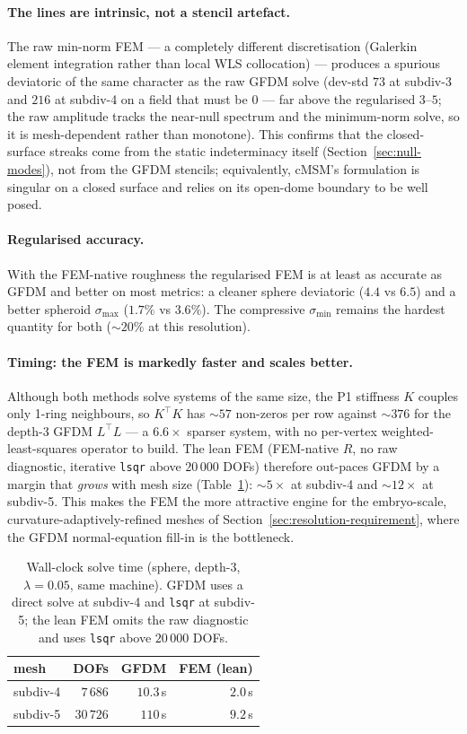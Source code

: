 \documentclass[11pt]{article}
\begin{document}
\paragraph{The lines are intrinsic, not a stencil artefact.}  The raw min-norm
FEM --- a completely different discretisation (Galerkin element integration rather
than local WLS collocation) --- produces a spurious deviatoric of the same
character as the raw GFDM solve (dev-std $73$ at subdiv-3 and $216$ at subdiv-4 on
a field that must be $0$ --- far above the regularised $3$--$5$; the raw amplitude
tracks the near-null spectrum and the minimum-norm solve, so it is mesh-dependent
rather than monotone).  This confirms that
the closed-surface streaks come from the static indeterminacy itself
(Section~\ref{sec:null-modes}), not from the GFDM stencils; equivalently, cMSM's
formulation is singular on a closed surface and relies on its open-dome boundary to
be well posed.

\paragraph{Regularised accuracy.}  With the FEM-native roughness the regularised
FEM is at least as accurate as GFDM and better on most metrics: a cleaner sphere
deviatoric ($4.4$ vs $6.5$) and a better spheroid $\sigma_{\max}$ ($1.7\%$ vs
$3.6\%$).  The compressive $\sigma_{\min}$ remains the hardest quantity for both
(${\sim}20\%$ at this resolution).

\paragraph{Timing: the FEM is markedly faster and scales better.}  Although both
methods solve systems of the same size, the P1 stiffness $K$ couples only 1-ring
neighbours, so $K^\top K$ has ${\sim}57$ non-zeros per row against ${\sim}376$ for
the depth-3 GFDM $L^\top L$ --- a $6.6\times$ sparser system, with no per-vertex
weighted-least-squares operator to build.  The lean FEM (FEM-native $R$, no raw
diagnostic, iterative \texttt{lsqr} above $20\,000$ DOFs) therefore out-paces GFDM
by a margin that \emph{grows} with mesh size (Table~\ref{tab:femtiming}):
${\sim}5\times$ at subdiv-4 and ${\sim}12\times$ at subdiv-5.  This makes the FEM
the more attractive engine for the embryo-scale, curvature-adaptively-refined
meshes of Section~\ref{sec:resolution-requirement}, where the GFDM
normal-equation fill-in is the bottleneck.

\begin{table}[ht]\centering
\caption{Wall-clock solve time (sphere, depth-3, $\lambda=0.05$, same machine).
GFDM uses a direct solve at subdiv-4 and \texttt{lsqr} at subdiv-5; the lean FEM
omits the raw diagnostic and uses \texttt{lsqr} above $20\,000$ DOFs.}
\label{tab:femtiming}
\begin{tabular}{lrrr}
\toprule
mesh & DOFs & GFDM & FEM (lean) \\
\midrule
subdiv-4 & $7\,686$  & $10.3$\,s & $2.0$\,s \\
subdiv-5 & $30\,726$ & $110$\,s  & $9.2$\,s \\
\bottomrule
\end{tabular}
\end{table}
\end{document}
